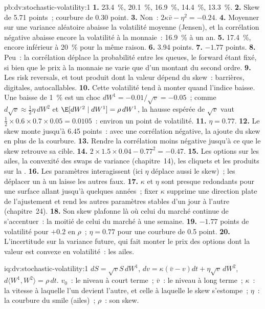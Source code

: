 \begin{solution}{pb:dv:stochastic-volatility:1}
\textbf{1.} 23.4~\%, 20.1~\%, 16.9~\%, 14.4~\%, 13.3~\%.
\textbf{2.} Skew de 5.71 points~; courbure de 0.30 point.
\textbf{3.} Non~: $2\kappa\bar v-\eta^2=-0.24$.
\textbf{4.} Moyenner sur une variance aléatoire abaisse la volatilité moyenne (Jensen), et la corrélation négative
abaisse encore la volatilité à la monnaie~: 16.9~\% à un an.
\textbf{5.} 17.4~\%, encore inférieur à 20~\% pour la même raison.
\textbf{6.} 3.94 points.
\textbf{7.} $-1.77$ points.
\textbf{8.} Peu~: la corrélation déplace la probabilité entre les queues, le forward étant fixé, si bien que le
prix à la monnaie ne varie que d'un montant du second ordre.
\textbf{9.} Les risk reversals, et tout produit dont la valeur dépend du skew~: barrières, digitales, autocallables.
\textbf{10.} Cette volatilité tend à monter quand l'indice baisse. Une baisse de 1~\% est un choc
$dW^1=-0.01/\sqrt{v}=-0.05$~; comme $d\sqrt v\approx\tfrac12\eta\,dW^2$ et $\E[dW^2\mid dW^1]=\rho\,dW^1$, la
hausse espérée de $\sqrt v$ vaut $\tfrac12\times0.6\times0.7\times0.05=0.0105$~: environ un point de volatilité.
\textbf{11.} $\eta=0.77$.
\textbf{12.} Le skew monte jusqu'à 6.45 points~: avec une corrélation négative, la  ajoute
du skew en plus de la courbure.
\textbf{13.} Rendre la corrélation moins négative jusqu'à ce que le skew retrouve sa cible.
\textbf{14.} $2\times1.5\times0.04-0.77^2=-0.47$.
\textbf{15.} Les options sur les ailes, la convexité des swaps de variance (chapitre~14), les cliquets et les produits sur la .
\textbf{16.} Les paramètres interagissent (ici $\eta$ déplace aussi le skew)~; les déplacer un à un laisse les autres
faux.
\textbf{17.} $\kappa$ et $\eta$ sont presque redondants pour une surface allant jusqu'à quelques années~; fixer $\kappa$ supprime une
direction plate de l'ajustement et rend les autres paramètres stables d'un jour à l'autre (chapitre~24).
\textbf{18.} Son skew plafonne là où celui du marché continue de s'accentuer~: la moitié de celui du marché à une semaine.
\textbf{19.} $-1.77$ points de volatilité pour $+0.2$ en $\rho$~; $\eta=0.77$ pour une courbure de 0.5 point.
\textbf{20.} L'incertitude sur la variance future, qui fait monter le prix des options dont la valeur est convexe en
volatilité~: les ailes.
\end{solution}

\begin{solution}{iq:dv:stochastic-volatility:1}
$dS=\sqrt vS\,dW^1$, $dv=\kappa(\bar v-v)dt+\eta\sqrt v\,dW^2$, $d\langle W^1,W^2\rangle=\rho\,dt$. $v_0$~: le niveau
à court terme~; $\bar v$~: le niveau à long terme~; $\kappa$~: la vitesse à laquelle l'un devient l'autre, et celle à laquelle le skew s'estompe~; $\eta$~: la
courbure du smile (ailes)~; $\rho$~: son skew.
\end{solution}

